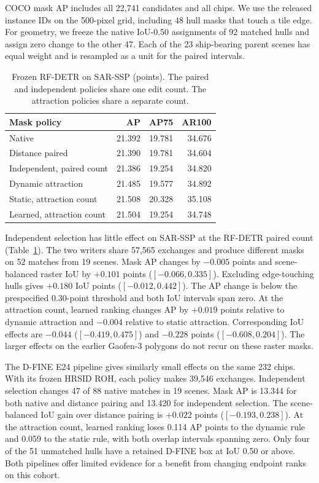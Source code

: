 \documentclass[journal]{IEEEtran}
\begin{document}
COCO mask AP includes all 22,741 candidates and all chips. We use the released instance IDs on the 500-pixel grid, including 48 hull masks that touch a tile edge. For geometry, we freeze the native IoU-0.50 assignments of 92 matched hulls and assign zero change to the other 47. Each of the 23 ship-bearing parent scenes has equal weight and is resampled as a unit for the paired intervals.

\begin{table}[t]
\centering
\caption{Frozen RF-DETR on SAR-SSP (points). The paired and independent policies share one edit count. The attraction policies share a separate count.}
\label{tab:sar-ssp}
\footnotesize
\renewcommand{\arraystretch}{0.91}
\begin{tabular}{@{}lrrr@{}}
\toprule
Mask policy & AP & AP75 & AR100 \\
\midrule
Native & 21.392 & 19.781 & 34.676 \\
Distance paired & 21.390 & 19.781 & 34.604 \\
Independent, paired count & 21.386 & 19.254 & 34.820 \\
\midrule
Dynamic attraction & 21.485 & 19.577 & 34.892 \\
Static, attraction count & 21.508 & 20.328 & 35.108 \\
Learned, attraction count & 21.504 & 19.254 & 34.748 \\
\bottomrule
\end{tabular}
\end{table}

Independent selection has little effect on SAR-SSP at the RF-DETR paired count (Table~\ref{tab:sar-ssp}). The two writers share 57,565 exchanges and produce different masks on 52 matches from 19 scenes. Mask AP changes by \(-0.005\) points and scene-balanced raster IoU by \(+0.101\) points (\([-0.066,0.335]\)). Excluding edge-touching hulls gives \(+0.180\) IoU points (\([-0.012,0.442]\)). The AP change is below the prespecified 0.30-point threshold and both IoU intervals span zero. At the attraction count, learned ranking changes AP by \(+0.019\) points relative to dynamic attraction and \(-0.004\) relative to static attraction. Corresponding IoU effects are \(-0.044\) (\([-0.419,0.475]\)) and \(-0.228\) points (\([-0.608,0.204]\)). The larger effects on the earlier Gaofen-3 polygons do not recur on these raster masks.

The D-FINE E24 pipeline gives similarly small effects on the same 232 chips. With its frozen HRSID ROH, each policy makes 39,546 exchanges. Independent selection changes 47 of 88 native matches in 19 scenes. Mask AP is 13.344 for both native and distance pairing and 13.420 for independent selection. The scene-balanced IoU gain over distance pairing is \(+0.022\) points (\([-0.193,0.238]\)). At the attraction count, learned ranking loses 0.114 AP points to the dynamic rule and 0.059 to the static rule, with both overlap intervals spanning zero. Only four of the 51 unmatched hulls have a retained D-FINE box at IoU 0.50 or above. Both pipelines offer limited evidence for a benefit from changing endpoint ranks on this cohort.
\end{document}
